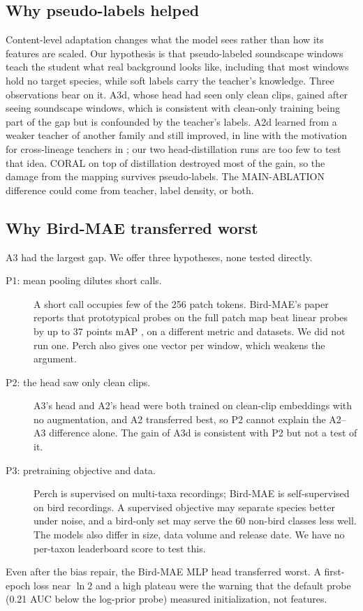\documentclass[letterpaper]{article} %
\begin{document}
\subsection{Why pseudo-labels helped}
Content-level adaptation changes what the model sees rather than how its features are scaled. Our hypothesis is that pseudo-labeled soundscape windows teach the student what real background looks like, including that most windows hold no target species, while soft labels carry the teacher's knowledge. Three observations bear on it. A3d, whose head had seen only clean clips, gained after seeing soundscape windows, which is consistent with clean-only training being part of the gap but is confounded by the teacher's labels. A2d learned from a weaker teacher of another family and still improved, in line with the motivation for cross-lineage teachers in \citet{farazi2026crossmutated}; our two head-distillation runs are too few to test that idea. CORAL on top of distillation destroyed most of the gain, so the damage from the mapping survives pseudo-labels. The MAIN-ABLATION difference could come from teacher, label density, or both.

\subsection{Why Bird-MAE transferred worst}
A3 had the largest gap. We offer three hypotheses, none tested directly.
\begin{description}
\item[P1: mean pooling dilutes short calls.] A short call occupies few of the 256 patch tokens. Bird-MAE's paper reports that prototypical probes on the full patch map beat linear probes by up to 37 points mAP \citep{rauch2025can}, on a different metric and datasets. We did not run one. Perch also gives one vector per window, which weakens the argument.
\item[P2: the head saw only clean clips.] A3's head and A2's head were both trained on clean-clip embeddings with no augmentation, and A2 transferred best, so P2 cannot explain the A2--A3 difference alone. The gain of A3d is consistent with P2 but not a test of it.
\item[P3: pretraining objective and data.] Perch is supervised on multi-taxa recordings; Bird-MAE is self-supervised on bird recordings. A supervised objective may separate species better under noise, and a bird-only set may serve the 60 non-bird classes less well. The models also differ in size, data volume and release date. We have no per-taxon leaderboard score to test this.
\end{description}
Even after the bias repair, the Bird-MAE MLP head transferred worst. A first-epoch loss near $\ln 2$ and a high plateau were the warning that the default probe (0.21 AUC below the log-prior probe) measured initialization, not features.
\end{document}
